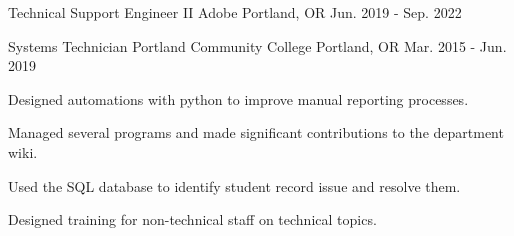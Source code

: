 

\begin{cventries}
  \cventry
    {Technical Support Engineer II} %
    {Adobe} %
    {Portland, OR} %
    {Jun. 2019 - Sep. 2022} %
    {
    }

  \cventry
    {Systems Technician} %
    {Portland Community College} %
    {Portland, OR} %
    {Mar. 2015 - Jun. 2019} %
    {
      \begin{cvitems} %
        \item {Designed automations with python to improve manual reporting processes.}
        \item {Managed several programs and made significant contributions to the department wiki.}
        \item {Used the SQL database to identify student record issue and resolve them.}
        \item {Designed training for non-technical staff on technical topics.}
      \end{cvitems}
    }

\end{cventries}